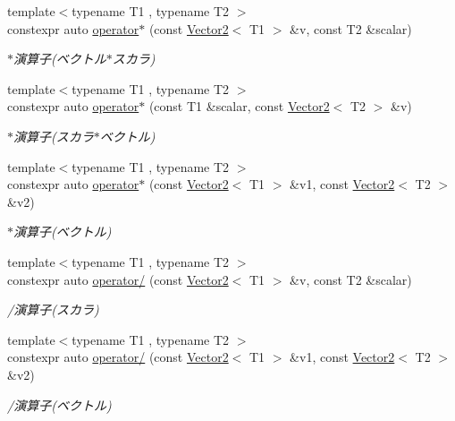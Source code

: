 \begin{DoxyCompactItemize}
{\footnotesize template$<$typename T1 , typename T2 $>$ }\\constexpr auto \mbox{\hyperlink{namespacesaki_a9b267db283c1b65ccf046a239443f5dd}{operator$\ast$}} (const \mbox{\hyperlink{classsaki_1_1_vector2}{Vector2}}$<$ T1 $>$ \&v, const T2 \&scalar)
\begin{DoxyCompactList}\small\item\em $\ast$演算子(ベクトル$\ast$スカラ) \end{DoxyCompactList}\item 
{\footnotesize template$<$typename T1 , typename T2 $>$ }\\constexpr auto \mbox{\hyperlink{namespacesaki_aec277082fba09344ebcffc5bdab6eb49}{operator$\ast$}} (const T1 \&scalar, const \mbox{\hyperlink{classsaki_1_1_vector2}{Vector2}}$<$ T2 $>$ \&v)
\begin{DoxyCompactList}\small\item\em $\ast$演算子(スカラ$\ast$ベクトル) \end{DoxyCompactList}\item 
{\footnotesize template$<$typename T1 , typename T2 $>$ }\\constexpr auto \mbox{\hyperlink{namespacesaki_aa99ace9b4d1710c38d180a75514e748f}{operator$\ast$}} (const \mbox{\hyperlink{classsaki_1_1_vector2}{Vector2}}$<$ T1 $>$ \&v1, const \mbox{\hyperlink{classsaki_1_1_vector2}{Vector2}}$<$ T2 $>$ \&v2)
\begin{DoxyCompactList}\small\item\em $\ast$演算子(ベクトル) \end{DoxyCompactList}\item 
{\footnotesize template$<$typename T1 , typename T2 $>$ }\\constexpr auto \mbox{\hyperlink{namespacesaki_a43404fc455816a29474cce93fc5cff50}{operator/}} (const \mbox{\hyperlink{classsaki_1_1_vector2}{Vector2}}$<$ T1 $>$ \&v, const T2 \&scalar)
\begin{DoxyCompactList}\small\item\em /演算子(スカラ) \end{DoxyCompactList}\item 
{\footnotesize template$<$typename T1 , typename T2 $>$ }\\constexpr auto \mbox{\hyperlink{namespacesaki_a6af4b5a4a56add022ed5bfde525d5979}{operator/}} (const \mbox{\hyperlink{classsaki_1_1_vector2}{Vector2}}$<$ T1 $>$ \&v1, const \mbox{\hyperlink{classsaki_1_1_vector2}{Vector2}}$<$ T2 $>$ \&v2)
\begin{DoxyCompactList}\small\item\em /演算子(ベクトル) \end{DoxyCompactList}\item 

\end{DoxyCompactItemize}
